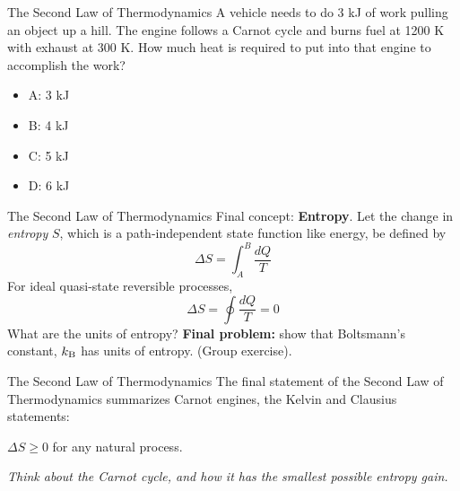 \documentclass{beamer}
\begin{document}
\begin{frame}{The Second Law of Thermodynamics}
A vehicle needs to do 3 kJ of work pulling an object up a hill.  The engine follows a Carnot cycle and burns fuel at 1200 K with exhaust at 300 K.  How much heat is required to put into that engine to accomplish the work?
\begin{itemize}
\item A: 3 kJ
\item B: 4 kJ
\item C: 5 kJ
\item D: 6 kJ
\end{itemize}
\end{frame}

\begin{frame}{The Second Law of Thermodynamics}
Final concept: \textbf{Entropy}.  Let the change in \textit{entropy} $S$, which is a path-independent state function like energy, be defined by
\begin{equation}
\Delta S = \int_{A}^B \frac{dQ}{T}
\end{equation}
For ideal quasi-state reversible processes,
\begin{equation}
\Delta S = \oint \frac{dQ}{T} = 0
\end{equation}
What are the units of entropy?  \textbf{Final problem:} show that Boltsmann's constant, $k_{\rm B}$ has units of entropy. (Group exercise).
\end{frame}

\begin{frame}{The Second Law of Thermodynamics}
The final statement of the Second Law of Thermodynamics summarizes Carnot engines, the Kelvin and Clausius statements:
\\ \vspace{0.5cm}
\begin{tcolorbox}[colback=white,colframe=red!40!blue,title=The \textit{Entropy Statement} of the Second Law of Thermodynamics]
\alert{$\Delta S \geq 0$ for any natural process.}
\end{tcolorbox}
\vspace{0.5cm}
\textit{Think about the Carnot cycle, and how it has the smallest possible entropy gain.}
\end{frame}
\end{document}
